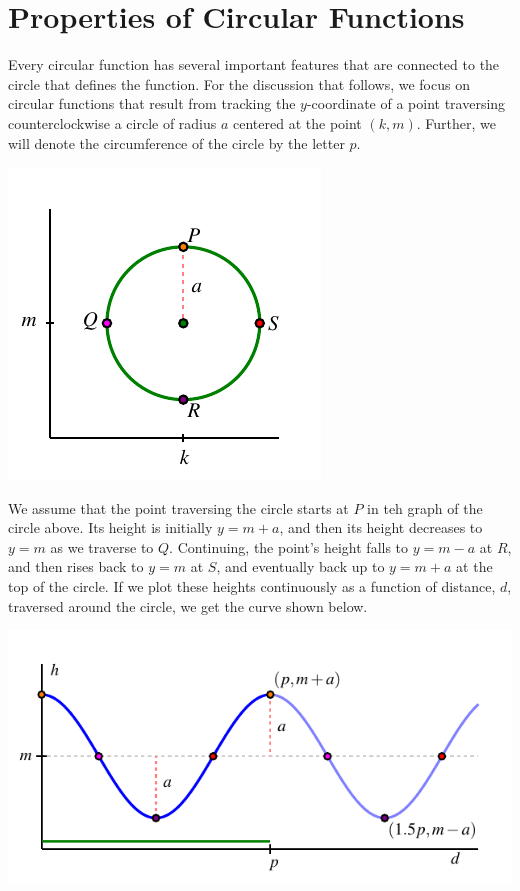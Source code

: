 \documentclass[nooutcomes, noauthor]{ximera}
\begin{document}


\section{Properties of Circular Functions}

Every circular function has several important features that are connected to the circle that defines the function.  For the discussion that follows, we focus on circular functions that result from tracking the \(y\)-coordinate of a point traversing counterclockwise a circle of radius \(a\) centered at the point \((k,m)\).  Further, we will denote the circumference of the circle by the letter \(p\).%

\begin{image}
\includegraphics{traversing-circular-properties-circle.pdf}
\end{image}

We assume that the point traversing the circle starts at \(P\) in teh graph of the circle above.  Its height is initially \(y = m + a\), and then its height decreases to \(y = m\) as we traverse to \(Q\).  Continuing, the point's height falls to \(y = m - a\) at \(R\), and then rises back to \(y = m\) at \(S\), and eventually back up to \(y = m+a\) at the top of the circle.  If we plot these heights continuously as a function of distance, \(d\), traversed around the circle, we get the curve shown below. 

\begin{image}
\includegraphics{traversing-circular-properties-graph.pdf}
\end{image}
\end{document}
